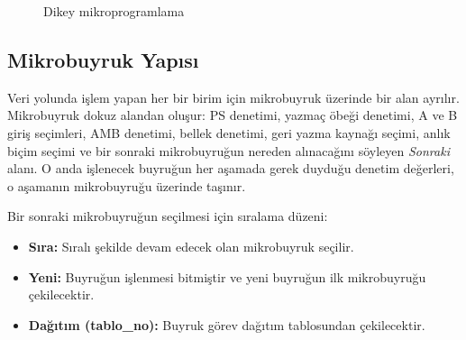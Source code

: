 \begin{figure}[htbp]
\centering
{}
\caption{Dikey mikroprogramlama}
\label{fig:dikey-mikro}
\end{figure}

\subsection{Mikrobuyruk Yapısı}
\label{subsec:mikrobuyruk-yapisi}

Veri yolunda işlem yapan her bir birim için mikrobuyruk üzerinde bir alan ayrılır. Mikrobuyruk dokuz alandan oluşur: PS denetimi, yazmaç öbeği denetimi, A ve B giriş seçimleri, AMB denetimi, bellek denetimi, geri yazma kaynağı seçimi, anlık biçim seçimi ve bir sonraki mikrobuyruğun nereden alınacağını söyleyen \emph{Sonraki} alanı. O anda işlenecek buyruğun her aşamada gerek duyduğu denetim değerleri, o aşamanın mikrobuyruğu üzerinde taşınır.

Bir sonraki mikrobuyruğun seçilmesi için sıralama düzeni:
\begin{itemize}
    \item \textbf{Sıra:} Sıralı şekilde devam edecek olan mikrobuyruk seçilir.
    \item \textbf{Yeni:} Buyruğun işlenmesi bitmiştir ve yeni buyruğun ilk mikrobuyruğu çekilecektir.
    \item \textbf{Dağıtım (tablo\_no):} Buyruk görev dağıtım tablosundan çekilecektir.
\end{itemize}

